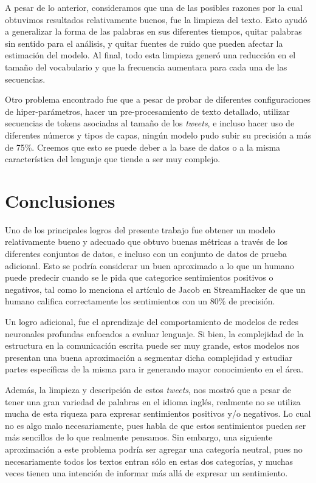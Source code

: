\documentclass[sigconf, nonacm, spanish]{acmart}
\begin{document}
A pesar de lo anterior, consideramos que una de las posibles razones por la cual obtuvimos resultados relativamente buenos, fue la limpieza del texto. Esto ayudó a generalizar la forma de las palabras en sus diferentes tiempos, quitar palabras sin sentido para el análisis, y quitar fuentes de ruido que pueden afectar la estimación del modelo. Al final, todo esta limpieza generó una reducción en el tamaño del vocabulario y que la frecuencia aumentara para cada una de las secuencias. 

Otro problema encontrado fue que a pesar de probar de diferentes configuraciones de hiper-parámetros, hacer un pre-procesamiento de texto detallado, utilizar secuencias de tokens asociadas al tamaño de los \textit{tweets}, e incluso hacer uso de diferentes números y tipos de capas, ningún modelo pudo subir su precisión a más de 75\%. Creemos que esto se puede deber a la base de datos o a la misma característica del lenguaje que tiende a ser muy complejo. 

\section{Conclusiones}

Uno de los principales logros del presente trabajo fue obtener un modelo relativamente bueno y adecuado que obtuvo buenas métricas a través de los diferentes conjuntos de datos, e incluso con un conjunto de datos de prueba adicional. Esto se podría considerar un buen aproximado a lo que un humano puede predecir cuando se le pida que categorice sentimientos positivos o negativos, tal como lo menciona el artículo de Jacob en StreamHacker \cite{Jacob} de que un humano califica correctamente los sentimientos con un 80\% de precisión. 

Un logro adicional, fue el aprendizaje del comportamiento de modelos de redes neuronales profundas enfocados a evaluar lenguaje. Si bien, la complejidad de la estructura en la comunicación escrita puede ser muy grande, estos modelos nos presentan una buena aproximación a segmentar dicha complejidad y estudiar partes específicas de la misma para ir generando mayor conocimiento en el área.

Además, la limpieza y descripción de estos \textit{tweets}, nos mostró que a pesar de tener una gran variedad de palabras en el idioma inglés, realmente no se utiliza mucha de esta riqueza para expresar sentimientos positivos y/o negativos. Lo cual no es algo malo necesariamente, pues habla de que estos sentimientos pueden ser más sencillos de lo que realmente pensamos. Sin embargo, una siguiente aproximación a este problema podría ser agregar una categoría neutral, pues no necesariamente todos los textos entran sólo en estas dos categorías, y muchas veces tienen una intención de informar más allá de expresar un sentimiento.
\end{document}
